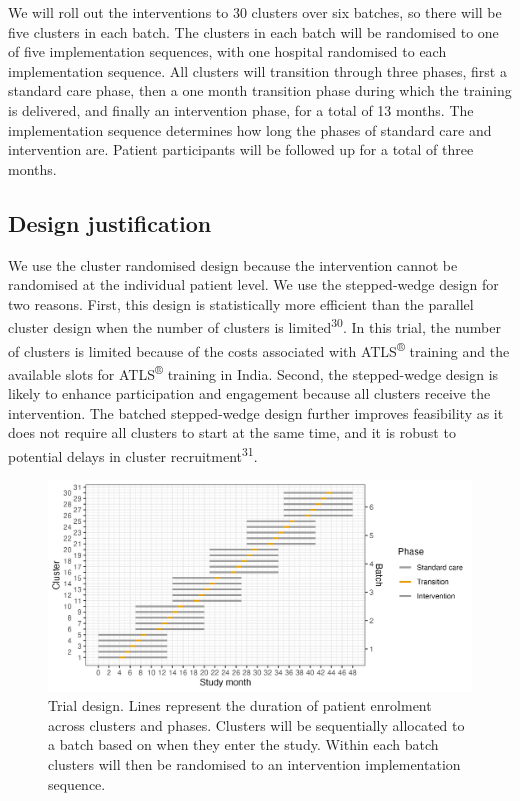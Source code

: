 \documentclass[
]{scrartcl}
\begin{document}
We will roll out the interventions to 30 clusters over six batches, so
there will be five clusters in each batch. The clusters in each batch
will be randomised to one of five implementation sequences, with one
hospital randomised to each implementation sequence. All clusters will
transition through three phases, first a standard care phase, then a one
month transition phase during which the training is delivered, and
finally an intervention phase, for a total of 13 months. The
implementation sequence determines how long the phases of standard care
and intervention are. Patient participants will be followed up for a
total of three months.

\hypertarget{design-justification}{%
\subsection{Design justification}\label{design-justification}}

We use the cluster randomised design because the intervention cannot be
randomised at the individual patient level. We use the stepped-wedge
design for two reasons. First, this design is statistically more
efficient than the parallel cluster design when the number of clusters
is limited\textsuperscript{30}. In this trial, the number of clusters is
limited because of the costs associated with ATLS\textsuperscript{®}
training and the available slots for ATLS\textsuperscript{®} training in
India. Second, the stepped-wedge design is likely to enhance
participation and engagement because all clusters receive the
intervention. The batched stepped-wedge design further improves
feasibility as it does not require all clusters to start at the same
time, and it is robust to potential delays in cluster
recruitment\textsuperscript{31}.

\begin{figure}

{\centering \includegraphics{trial-design-figure-30-clusters-5-sequences-6-batches-6-batches-overlap-4-min-standard-care-4-min-intervention-1-transition-months-0-transition-overlap.png}

}

\caption{\label{fig-trial-design}Trial design. Lines represent the
duration of patient enrolment across clusters and phases. Clusters will
be sequentially allocated to a batch based on when they enter the study.
Within each batch clusters will then be randomised to an intervention
implementation sequence.}

\end{figure}
\end{document}
